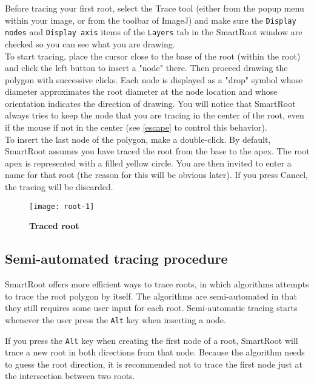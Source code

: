 \documentclass[a4paper,english,10pt]{report}
\begin{document}
Before tracing your first root, select the Trace tool (either from the popup menu within your image, or from the toolbar of ImageJ) and make sure the \verb|Display nodes| and \verb|Display axis| items of the \verb|Layers| tab in the SmartRoot window are checked so you can see what you are drawing. \\

To start tracing, place the cursor close to the base of the root (within the root) and click the left button to insert a "node" there. Then proceed drawing the polygon with successive clicks. Each node is displayed as a "drop" symbol whose diameter approximates the root diameter at the node location and whose orientation indicates the direction of drawing. You will notice that SmartRoot always tries to keep the node that you are tracing in the center of the root, even if the mouse if not in the center (see \ref{escape} to control this behavior). \\ 

To insert the last node of the polygon, make a double-click. By default, SmartRoot assumes you have traced the root from the base to the apex. The root apex is represented with a filled yellow circle. You are then invited to enter a name for that root (the reason for this will be obvious later). If you press Cancel, the tracing will be discarded.

\begin{figure}[htbp]
\begin{center}
\texttt{[image: root-1]}
\caption[Traced root]{\textbf{Traced root}}
\label{root-1}
\end{center}
\end{figure}


\subsection{Semi-automated tracing procedure}
\label{autoTrace}

SmartRoot offers more efficient ways to trace roots, in which algorithms attempts to trace the root polygon by itself. The algorithms are semi-automated in that they still requires some user input for each root. Semi-automatic tracing starts whenever the user press the {\color{coolBlue}\verb|Alt|} key when inserting a node.

If you press the {\color{coolBlue}\verb|Alt|} key when creating the first node of a root, SmartRoot will trace a new root in both directions from that node. Because the algorithm needs to guess the root direction, it is recommended not to trace the first node just at the intersection between two roots.
\end{document}
